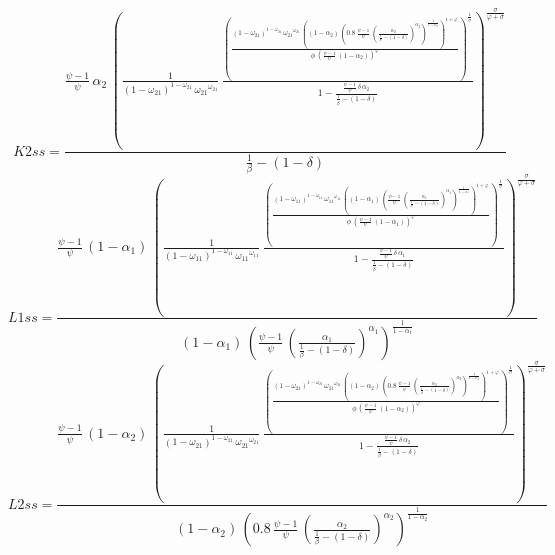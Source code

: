 \begin{dmath*}
K2ss = \frac{\frac{{{\psi}}-1}{{{\psi}}}\, {{\alpha_{2}}}\, \left(\frac{1}{\left(1-{{\omega_{21}}}\right)^{1-{{\omega_{21}}}}\, {{\omega_{21}}}^{{{\omega_{21}}}}}\, \frac{\left(\frac{\left(1-{{\omega_{21}}}\right)^{1-{{\omega_{21}}}}\, {{\omega_{21}}}^{{{\omega_{21}}}}\, \left(\left(1-{{\alpha_{2}}}\right)\, \left(0.8\, \frac{{{\psi}}-1}{{{\psi}}}\, \left(\frac{{{\alpha_{2}}}}{\frac{1}{{{\beta}}}-\left(1-{{\delta}}\right)}\right)^{{{\alpha_{2}}}}\right)^{\frac{1}{1-{{\alpha_{2}}}}}\right)^{1+{{\varphi}}}}{{{\phi}}\, \left(\frac{{{\psi}}-1}{{{\psi}}}\, \left(1-{{\alpha_{2}}}\right)\right)^{{{\varphi}}}}\right)^{\frac{1}{{{\sigma}}}}}{1-\frac{\frac{{{\psi}}-1}{{{\psi}}}\, {{\delta}}\, {{\alpha_{2}}}}{\frac{1}{{{\beta}}}-\left(1-{{\delta}}\right)}}\right)^{\frac{{{\sigma}}}{{{\varphi}}+{{\sigma}}}}}{\frac{1}{{{\beta}}}-\left(1-{{\delta}}\right)}
\end{dmath*}
\begin{dmath*}
L1ss = \frac{\frac{{{\psi}}-1}{{{\psi}}}\, \left(1-{{\alpha_{1}}}\right)\, \left(\frac{1}{\left(1-{{\omega_{11}}}\right)^{1-{{\omega_{11}}}}\, {{\omega_{11}}}^{{{\omega_{11}}}}}\, \frac{\left(\frac{\left(1-{{\omega_{11}}}\right)^{1-{{\omega_{11}}}}\, {{\omega_{11}}}^{{{\omega_{11}}}}\, \left(\left(1-{{\alpha_{1}}}\right)\, \left(\frac{{{\psi}}-1}{{{\psi}}}\, \left(\frac{{{\alpha_{1}}}}{\frac{1}{{{\beta}}}-\left(1-{{\delta}}\right)}\right)^{{{\alpha_{1}}}}\right)^{\frac{1}{1-{{\alpha_{1}}}}}\right)^{1+{{\varphi}}}}{{{\phi}}\, \left(\frac{{{\psi}}-1}{{{\psi}}}\, \left(1-{{\alpha_{1}}}\right)\right)^{{{\varphi}}}}\right)^{\frac{1}{{{\sigma}}}}}{1-\frac{\frac{{{\psi}}-1}{{{\psi}}}\, {{\delta}}\, {{\alpha_{1}}}}{\frac{1}{{{\beta}}}-\left(1-{{\delta}}\right)}}\right)^{\frac{{{\sigma}}}{{{\varphi}}+{{\sigma}}}}}{\left(1-{{\alpha_{1}}}\right)\, \left(\frac{{{\psi}}-1}{{{\psi}}}\, \left(\frac{{{\alpha_{1}}}}{\frac{1}{{{\beta}}}-\left(1-{{\delta}}\right)}\right)^{{{\alpha_{1}}}}\right)^{\frac{1}{1-{{\alpha_{1}}}}}}
\end{dmath*}
\begin{dmath*}
L2ss = \frac{\frac{{{\psi}}-1}{{{\psi}}}\, \left(1-{{\alpha_{2}}}\right)\, \left(\frac{1}{\left(1-{{\omega_{21}}}\right)^{1-{{\omega_{21}}}}\, {{\omega_{21}}}^{{{\omega_{21}}}}}\, \frac{\left(\frac{\left(1-{{\omega_{21}}}\right)^{1-{{\omega_{21}}}}\, {{\omega_{21}}}^{{{\omega_{21}}}}\, \left(\left(1-{{\alpha_{2}}}\right)\, \left(0.8\, \frac{{{\psi}}-1}{{{\psi}}}\, \left(\frac{{{\alpha_{2}}}}{\frac{1}{{{\beta}}}-\left(1-{{\delta}}\right)}\right)^{{{\alpha_{2}}}}\right)^{\frac{1}{1-{{\alpha_{2}}}}}\right)^{1+{{\varphi}}}}{{{\phi}}\, \left(\frac{{{\psi}}-1}{{{\psi}}}\, \left(1-{{\alpha_{2}}}\right)\right)^{{{\varphi}}}}\right)^{\frac{1}{{{\sigma}}}}}{1-\frac{\frac{{{\psi}}-1}{{{\psi}}}\, {{\delta}}\, {{\alpha_{2}}}}{\frac{1}{{{\beta}}}-\left(1-{{\delta}}\right)}}\right)^{\frac{{{\sigma}}}{{{\varphi}}+{{\sigma}}}}}{\left(1-{{\alpha_{2}}}\right)\, \left(0.8\, \frac{{{\psi}}-1}{{{\psi}}}\, \left(\frac{{{\alpha_{2}}}}{\frac{1}{{{\beta}}}-\left(1-{{\delta}}\right)}\right)^{{{\alpha_{2}}}}\right)^{\frac{1}{1-{{\alpha_{2}}}}}}
\end{dmath*}
